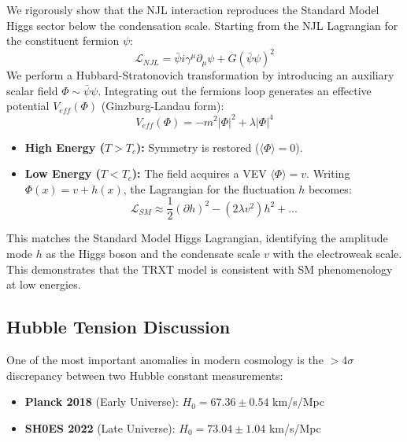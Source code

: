 \documentclass[a4paper,12pt]{article}
\begin{document}
We rigorously show that the NJL interaction reproduces the Standard Model Higgs sector below the condensation scale.
Starting from the NJL Lagrangian for the constituent fermion $\psi$:
\begin{equation}
    \mathcal{L}_{NJL} = \bar{\psi} i \gamma^\mu \partial_\mu \psi + G (\bar{\psi}\psi)^2
\end{equation}
We perform a Hubbard-Stratonovich transformation by introducing an auxiliary scalar field $\Phi \sim \bar{\psi}\psi$. Integrating out the fermions loop generates an effective potential $V_{eff}(\Phi)$ (Ginzburg-Landau form):
\begin{equation}
    V_{eff}(\Phi) = -m^2 |\Phi|^2 + \lambda |\Phi|^4
\end{equation}
\begin{itemize}
    \item \textbf{High Energy ($T > T_c$):} Symmetry is restored ($\langle \Phi \rangle = 0$).
    \item \textbf{Low Energy ($T < T_c$):} The field acquires a VEV $\langle \Phi \rangle = v$. Writing $\Phi(x) = v + h(x)$, the Lagrangian for the fluctuation $h$ becomes:
    \begin{equation}
        \mathcal{L}_{SM} \approx \frac{1}{2}(\partial h)^2 - (2\lambda v^2) h^2 + \dots
    \end{equation}
\end{itemize}
This matches the Standard Model Higgs Lagrangian, identifying the amplitude mode $h$ as the Higgs boson and the condensate scale $v$ with the electroweak scale. This demonstrates that the TRXT model is consistent with SM phenomenology at low energies.

\subsection{Hubble Tension Discussion}
One of the most important anomalies in modern cosmology is the $> 4\sigma$ discrepancy between two Hubble constant measurements:
\begin{itemize}
    \item \textbf{Planck 2018} (Early Universe): $H_0 = 67.36 \pm 0.54$ km/s/Mpc
    \item \textbf{SH0ES 2022} (Late Universe): $H_0 = 73.04 \pm 1.04$ km/s/Mpc \cite{riess2022}
\end{itemize}
\end{document}
